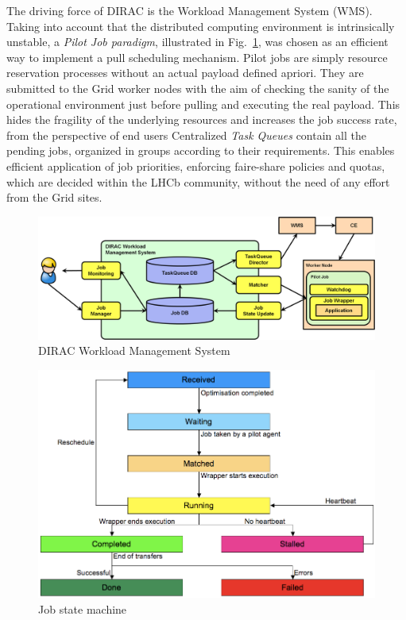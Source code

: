 \documentclass[10pt,conference]{IEEEtran}
\begin{document}
The driving force of DIRAC is the Workload Management System (WMS). Taking into
account that the distributed computing environment is intrinsically unstable, a
\textit{Pilot Job paradigm}, illustrated in Fig.~\ref{fig:DIRAC-WMS}, was chosen as an efficient way to
implement a pull scheduling mechanism.  Pilot jobs are simply resource
reservation processes without an actual payload defined apriori. They are
submitted to the Grid worker nodes with the aim of checking the sanity of the
operational environment just before pulling and executing the real payload. This
hides the fragility of the underlying resources and increases the job success
rate, from the perspective of end users Centralized \textit{Task Queues} contain all the
pending jobs, organized in groups according to their requirements. This enables
efficient application of job priorities, enforcing faire-share policies and
quotas, which are decided within the LHCb community, without the need of any
effort from the Grid sites.  
\begin{figure}[t]
\includegraphics[width=\linewidth,keepaspectratio=true]{./DIRAC_WMS.png}
\centering
\caption{DIRAC Workload Management System \cite{DIRAC_pilot_WMS}}
\label{fig:DIRAC-WMS}
\end{figure}

 \begin{figure}[b]
\includegraphics[width=\linewidth,keepaspectratio=true]{./dirac-primary-states.png}
\centering
\caption{Job state machine \cite{ProductionShifterGuide}}
\label{fig:DIRAC-job-state-machine}
\end{figure} 
\end{document}
